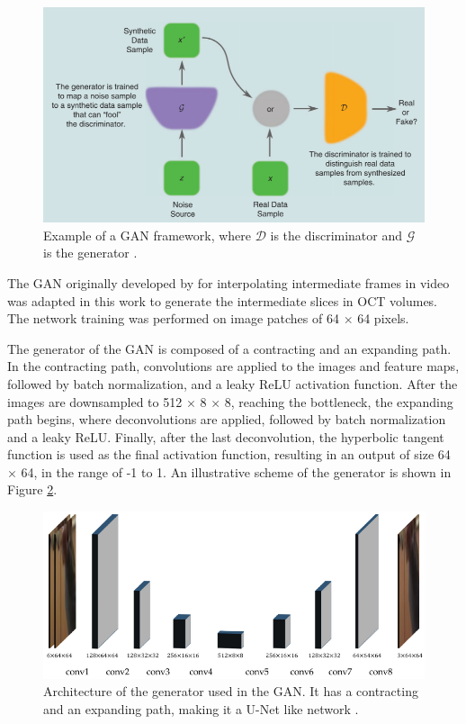 \begin{figure}[!ht]
	\centering
	\includegraphics[width=0.7\linewidth]{figures/GANFramework}
	\caption{Example of a GAN framework, where $\mathcal{D}$ is the discriminator and $\mathcal{G}$ is the generator \parencite{Creswell2018}.}
	\label{fig:GANFramework}
\end{figure}

The GAN originally developed by \textcite{Tran2020} for interpolating intermediate frames in video was adapted in this work to generate the intermediate slices in OCT volumes. The network training was performed on image patches of 64 $\times$ 64 pixels.
\par
The generator of the GAN is composed of a contracting and an expanding path. In the contracting path, convolutions are applied to the images and feature maps, followed by batch normalization, and a leaky ReLU activation function. After the images are downsampled to 512 $\times$ 8 $\times$ 8, reaching the bottleneck, the expanding path begins, where deconvolutions are applied, followed by batch normalization and a leaky ReLU. Finally, after the last deconvolution, the hyperbolic tangent function is used as the final activation function, resulting in an output of size 64 $\times$ 64, in the range of -1 to 1. An illustrative scheme of the generator is shown in Figure \ref{fig:GeneratorArchitecture}.

\begin{figure}[!ht]
	\centering
	\includegraphics[width=1.0\linewidth]{figures/GeneratorArchitecture}
	\caption{Architecture of the generator used in the GAN. It has a contracting and an expanding path, making it a U-Net like network \parencite{Tran2020}.}
	\label{fig:GeneratorArchitecture}
\end{figure}


